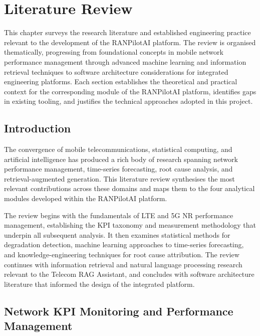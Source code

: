 \chapter{Literature Review}
\label{chap:literature_review}

This chapter surveys the research literature and established engineering practice relevant to the development of the RANPilotAI platform. The review is organised thematically, progressing from foundational concepts in mobile network performance management through advanced machine learning and information retrieval techniques to software architecture considerations for integrated engineering platforms. Each section establishes the theoretical and practical context for the corresponding module of the RANPilotAI platform, identifies gaps in existing tooling, and justifies the technical approaches adopted in this project.

\section{Introduction}

The convergence of mobile telecommunications, statistical computing, and artificial intelligence has produced a rich body of research spanning network performance management, time-series forecasting, root cause analysis, and retrieval-augmented generation. This literature review synthesises the most relevant contributions across these domains and maps them to the four analytical modules developed within the RANPilotAI platform.

The review begins with the fundamentals of LTE and 5G NR performance management, establishing the KPI taxonomy and measurement methodology that underpin all subsequent analysis. It then examines statistical methods for degradation detection, machine learning approaches to time-series forecasting, and knowledge-engineering techniques for root cause attribution. The review continues with information retrieval and natural language processing research relevant to the Telecom RAG Assistant, and concludes with software architecture literature that informed the design of the integrated platform.

\section{Network KPI Monitoring and Performance Management}

